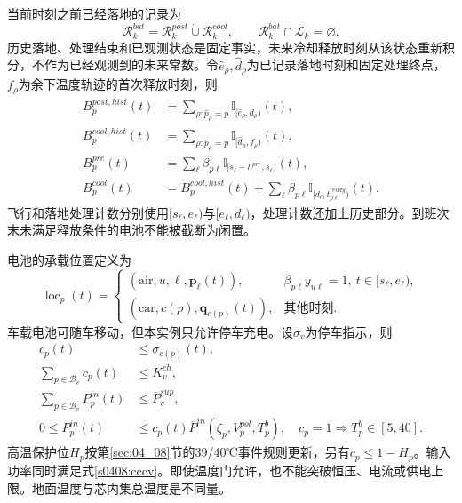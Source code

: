 当前时刻之前已经落地的记录为
\begin{equation}
 \mathcal R_k^{bat}=\mathcal R_k^{post}\mathbin{\dot\cup}\mathcal R_k^{cool},\qquad
 \mathcal R_k^{bat}\cap\mathcal L_k=\varnothing.
 \label{s0505:history_partition}
\end{equation}
历史落地、处理结束和已观测状态是固定事实，未来冷却释放时刻从该状态重新积分，不作为已经观测到的未来常数。令$\widehat e_\rho,\widehat d_\rho$为已记录落地时刻和固定处理终点，$f_\rho$为余下温度轨迹的首次释放时刻，则
\begin{align}
 B_p^{post,hist}(t)&=\sum_{\rho:\widehat p_\rho=p}\mathbb I_{[\widehat e_\rho,\widehat d_\rho)}(t),
 \label{s0505:historical_post_count}\\
 B_p^{cool,hist}(t)&=\sum_{\rho:\widehat p_\rho=p}\mathbb I_{[\widehat d_\rho,f_\rho)}(t),
 \label{s0505:historical_cool_count}\\
 B_p^{pre}(t)&=\sum_\ell\beta_{p\ell}\mathbb I_{[s_\ell-h^{pre},s_\ell)}(t),
 \label{s0505:pre_count}\\
 B_p^{cool}(t)&=B_p^{cool,hist}(t)+\sum_\ell\beta_{p\ell}\mathbb I_{[d_\ell,t_{p\ell}^{ready})}(t).
 \label{s0505:cool_count}
\end{align}
飞行和落地处理计数分别使用$[s_\ell,e_\ell)$与$[e_\ell,d_\ell)$，处理计数还加上历史部分。到班次末未满足释放条件的电池不能被截断为闲置。

电池的承载位置定义为
\begin{equation}
 \operatorname{loc}_p(t)=
 \begin{cases}
 (\mathrm{air},u,\ell,\mathbf p_\ell(t)),&\beta_{p\ell}y_{u\ell}=1,\ t\in[s_\ell,e_\ell),\\
 (\mathrm{car},c(p),\mathbf q_{c(p)}(t)),&\text{其他时刻}.
 \end{cases}
 \label{s0505:location}
\end{equation}
车载电池可随车移动，但本实例只允许停车充电。设$\sigma_v$为停车指示，则
\begin{align}
 c_p(t)&\le\sigma_{c(p)}(t),
 \label{s0505:charge_when_parked}\\
 \sum_{p\in\mathcal B_v}c_p(t)&\le K_v^{ch},
 \label{s0505:channel_capacity}\\
 \sum_{p\in\mathcal B_v}P_p^{in}(t)&\le\overline P_v^{sup},
 \label{s0505:source_power_capacity}\\
 0\le P_p^{in}(t)&\le c_p(t)\overline P^{in}(\zeta_p,V_p^{pol},T_p^b),\quad
 c_p=1\Rightarrow T_p^b\in[5,40].
 \label{s0505:input_power_gate}
\end{align}
高温保护位$H_p$按第\ref{sec:04_08}节的39/40℃事件规则更新，另有$c_p\le1-H_p$。输入功率同时满足式\eqref{s0408:cccv}。即使温度门允许，也不能突破恒压、电流或供电上限。地面温度与芯内集总温度是不同量。

